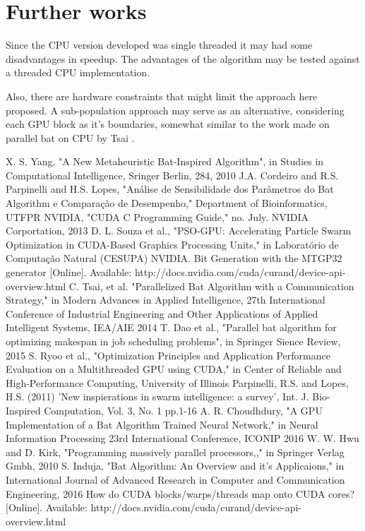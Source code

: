 \documentclass[conference]{IEEEtran}
\begin{document}
\section{Further works} %

Since the CPU version developed was single threaded it may had some
disadvantages in speedup. The advantages of the algorithm may be tested
against a threaded CPU implementation.

Also, there are hardware constraints that might limit the approach
here proposed. A sub-population approach may serve as an alternative,
considering each GPU block as it's boundaries, somewhat similar to the
work made on parallel bat on CPU by Tsai \cite{paralellCPU}.


\begin{thebibliography}{1} %
    X. S. Yang, "A New Metaheuristic Bat-Inspired Algorithm", in Studies in Computational Intelligence, Sringer Berlin, 284, 2010
    J.A. Cordeiro and R.S. Parpinelli and H.S. Lopes, "Análise de Sensibilidade dos Parâmetros do Bat Algorithm e Comparação de Desempenho," Department of Bioinformatics, UTFPR
    NVIDIA, "CUDA C Programming Guide," no. July. NVIDIA Corportation, 2013
    D. L. Souza et al., "PSO-GPU: Accelerating Particle Swarm Optimization in CUDA-Based
    Graphics Processing Units," in Laboratório de Computação Natural
    (CESUPA)
    NVIDIA.  Bit Generation with the MTGP32 generator [Online]. Available: http://docs.nvidia.com/cuda/curand/device-api-overview.html
    C. Tsai, et al. "Parallelized Bat Algorithm with a Communication Strategy," in Modern Advances in Applied Intelligence, 27th International Conference of Industrial Engineering and Other Applications of Applied Intelligent Systems, IEA/AIE 2014
    T. Dao et al.,  "Parallel bat algorithm for optimizing makespan in job scheduling problems", in Springer Sience Review, 2015
    S. Ryoo et al.,  "Optimization Principles and Application Performance Evaluation on a Multithreaded GPU using CUDA," in Center of Reliable and High-Performance Computing, University of Illinois
    Parpinelli, R.S. and Lopes, H.S. (2011) 'New inspierations in swarm intelligence: a survey', Int. J. Bio-Inspired Computation, Vol. 3, No. 1 pp.1-16
    A. R. Choudhdury, "A GPU Implementation of a Bat Algorithm Trained Neural Network," in Neural Information Processing 23rd International Conference, ICONIP 2016
    W. W. Hwu and D. Kirk, "Programming massively parallel processors,," in Springer Verlag Gmbh, 2010
    S. Induja, "Bat Algorithm: An Overview and it's Applicaions,"
    in International Journal of Advanced Research in Computer and Communication Engineering, 2016
    How do CUDA blocks/warps/threads map onto CUDA cores? [Online]. Available: http://docs.nvidia.com/cuda/curand/device-api-overview.html

\end{thebibliography}
\end{document}
